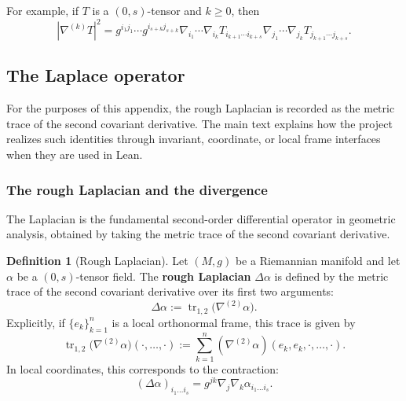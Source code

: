 \documentclass[11pt]{article}
\theoremstyle{plain}
\theoremstyle{definition}
\newtheorem{definition}[theorem]{Definition}
\theoremstyle{remark}
\begin{document}
For example, if $T$ is a $(0,s)$-tensor and $k\geq 0$, then
\begin{equation}
    |\nabla^{(k)}T|^2 = g^{i_1 j_1} \cdots g^{i_{s+k} j_{s+k}} \nabla_{i_1}\cdots \nabla_{i_k}T_{i_{k+1} \cdots i_{k+s}} \nabla_{j_1} \cdots \nabla_{j_k}T_{j_{k+1} \cdots j_{k+s}} .
\end{equation}

\subsection{The Laplace operator}

For the purposes of this appendix, the rough Laplacian is recorded as the
metric trace of the second covariant derivative.  The main text explains how
the project realizes such identities through invariant, coordinate, or local
frame interfaces when they are used in Lean.

\subsubsection{The rough Laplacian and the divergence}


The Laplacian is the fundamental second-order differential operator in
geometric analysis, obtained by taking the metric trace of the second
covariant derivative.

\begin{definition}[Rough Laplacian]
\label{def:rough_laplacian}
    Let $(M, g)$ be a Riemannian manifold and let $\alpha$ be a $(0,s)$-tensor field.
    The \textbf{rough Laplacian} $\Delta \alpha$ is defined by the metric trace of the second covariant derivative over its first two arguments:
    \begin{equation}
        \Delta \alpha := \operatorname{tr}_{1,2} \big( \nabla^{(2)} \alpha \big).
    \end{equation}
    Explicitly, if $\{e_k\}_{k=1}^n$ is a local orthonormal frame, this trace is given by
    \begin{equation}
        \operatorname{tr}_{1,2} \big( \nabla^{(2)} \alpha \big) (\cdot, \dots, \cdot) := \sum_{k=1}^n (\nabla^{(2)} \alpha)(e_k, e_k, \cdot, \dots, \cdot).
    \end{equation}
    In local coordinates, this corresponds to the contraction:
    \begin{equation}
        (\Delta \alpha)_{i_1 \dots i_s} = g^{jk} \nabla_j \nabla_k \alpha_{i_1 \dots i_s}.
    \end{equation}
\end{definition}
\end{document}

